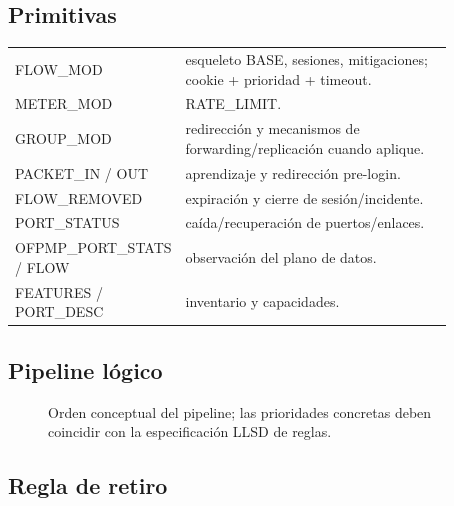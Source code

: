 \documentclass[11pt,a4paper]{article}
\begin{document}
\subsection{Primitivas}

\begin{longtable}{p{0.2\linewidth}p{0.67\linewidth}}
\toprule
FLOW\_MOD & esqueleto BASE, sesiones, mitigaciones; cookie + prioridad + timeout.\\
METER\_MOD & RATE\_LIMIT.\\
GROUP\_MOD & redirección y mecanismos de forwarding/replicación cuando aplique.\\
PACKET\_IN / OUT & aprendizaje y redirección pre-login.\\
FLOW\_REMOVED & expiración y cierre de sesión/incidente.\\
PORT\_STATUS & caída/recuperación de puertos/enlaces.\\
OFPMP\_PORT\_STATS / FLOW & observación del plano de datos.\\
FEATURES / PORT\_DESC & inventario y capacidades.\\
\bottomrule
\end{longtable}

\subsection{Pipeline lógico}

\begin{figure}[H]
\centering
{}
\caption{Orden conceptual del pipeline; las prioridades concretas deben coincidir con la especificación LLSD de reglas.}
\end{figure}

\subsection{Regla de retiro}
\end{document}
